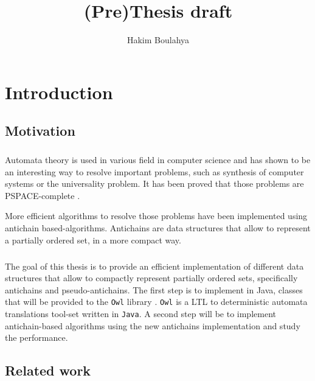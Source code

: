 \documentclass[letterpaper]{memoir}
\title{(Pre)Thesis draft}
\author{Hakim Boulahya}
\begin{document}
\maketitle

\tableofcontents

\listoftodos

\chapter{Introduction}


\section{Motivation}

\paragraph{}


Automata theory is used in various field in computer science and has shown
to be an interesting way to resolve important problems,
such as synthesis of computer systems
or the universality problem. It has been proved that those problems are
PSPACE-complete \cite{ant_univers}.

More efficient algorithms to resolve those problems have been implemented
using antichain based-algorithms. Antichains are data structures that allow
to represent a partially ordered set, in a more compact way.

\paragraph{}


The goal of this thesis is to provide an efficient implementation of different
data structures that allow to compactly
represent partially ordered sets, specifically antichains and pseudo-antichains.
The first step is to implement in Java, classes that will be provided to
the \texttt{Owl} library \cite{owl}.
\texttt{Owl} is a LTL to deterministic automata translations tool-set written
in \texttt{Java}. A second step will be to implement
antichain-based algorithms using the new antichains implementation and
study the performance.


\section{Related work}
\end{document}
